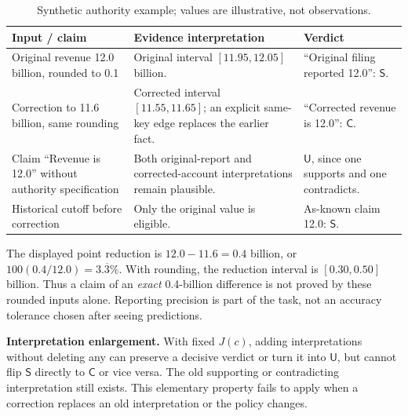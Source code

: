 \documentclass[11pt,a4paper]{article}
\newcommand{\pbreak}{\clearpage}
\newcommand{\lead}[1]{\textbf{\color{navy}#1}}
\newcommand{\Slabel}{\mathsf{S}}
\newcommand{\Clabel}{\mathsf{C}}
\newcommand{\Ulabel}{\mathsf{U}}
\begin{document}
\begin{table}[H]\caption{Synthetic authority example; values are illustrative, not observations.}
\small\begin{tabularx}{\linewidth}{p{.27\linewidth}YY}\toprule
Input / claim & Evidence interpretation & Verdict\\\midrule
Original revenue 12.0 billion, rounded to 0.1 & Original interval $[11.95,12.05]$ billion. & “Original filing reported 12.0”: $\Slabel$.\\
Correction to 11.6 billion, same rounding & Corrected interval $[11.55,11.65]$; an explicit same-key edge replaces the earlier fact. & “Corrected revenue is 12.0”: $\Clabel$.\\
Claim “Revenue is 12.0” without authority specification & Both original-report and corrected-account interpretations remain plausible. & $\Ulabel$, since one supports and one contradicts.\\
Historical cutoff before correction & Only the original value is eligible. & As-known claim 12.0: $\Slabel$.\\\bottomrule
\end{tabularx}\end{table}

The displayed point reduction is $12.0-11.6=0.4$ billion, or $100(0.4/12.0)=3.\overline{3}\%$. With rounding, the reduction interval is $[0.30,0.50]$ billion. Thus a claim of an \emph{exact} 0.4-billion difference is not proved by these rounded inputs alone. Reporting precision is part of the task, not an accuracy tolerance chosen after seeing predictions.

\lead{Interpretation enlargement.} With fixed $J(c)$, adding interpretations without deleting any can preserve a decisive verdict or turn it into $\Ulabel$, but cannot flip $\Slabel$ directly to $\Clabel$ or vice versa. The old supporting or contradicting interpretation still exists. This elementary property fails to apply when a correction replaces an old interpretation or the policy changes.

\pbreak
\end{document}
